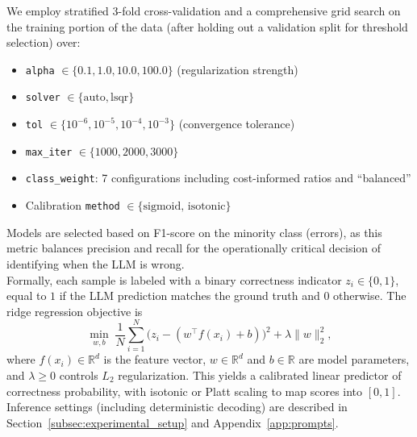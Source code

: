 We employ stratified $3$-fold cross-validation and a comprehensive grid search on the training portion of the data (after holding out a validation split for threshold selection) over:
\begin{itemize}
    \item \texttt{alpha} $\in \{0.1, 1.0, 10.0, 100.0\}$ (regularization strength)
    \item \texttt{solver} $\in \{\text{auto}, \text{lsqr}\}$
    \item \texttt{tol} $\in \{10^{-6}, 10^{-5}, 10^{-4}, 10^{-3}\}$ (convergence tolerance)
    \item \texttt{max\_iter} $\in \{1000, 2000, 3000\}$
    \item \texttt{class\_weight}: 7 configurations including cost-informed ratios and ``balanced''
    \item Calibration \texttt{method} $\in \{\text{sigmoid, isotonic}\}$
\end{itemize}
Models are selected based on F1-score on the minority class (errors), as this metric balances precision and recall for the operationally critical decision of identifying when the LLM is wrong.\\
Formally, each sample is labeled with a binary correctness indicator $z_i \in \{0,1\}$, equal to $1$ if the LLM prediction matches the ground truth and $0$ otherwise.  
The ridge regression objective is
\[
\min_{w,b} \; \frac{1}{N}\sum_{i=1}^N \big(z_i - (w^\top f(x_i) + b)\big)^2 + \lambda \|w\|_2^2,
\]
where $f(x_i) \in \mathbb{R}^d$ is the feature vector, $w \in \mathbb{R}^d$ and $b \in \mathbb{R}$ are model parameters, and $\lambda \ge 0$ controls $L_2$ regularization. This yields a calibrated linear predictor of correctness probability, with isotonic or Platt scaling to map scores into $[0,1]$.
Inference settings (including deterministic decoding) are described in Section~\ref{subsec:experimental_setup} and Appendix~\ref{app:prompts}.